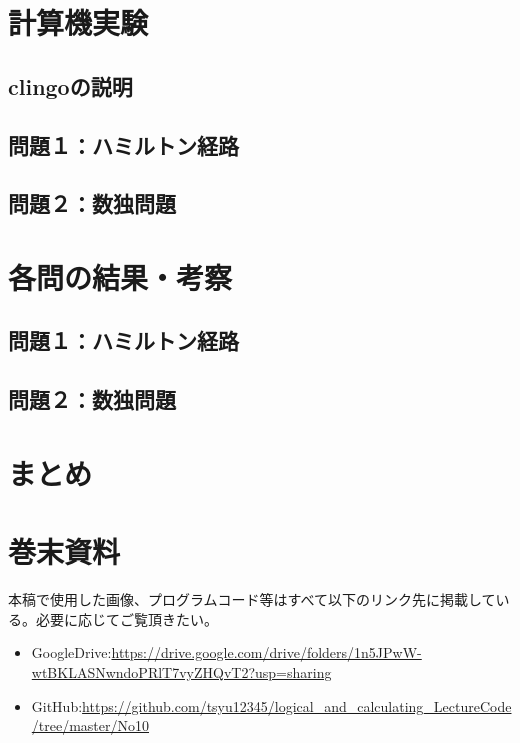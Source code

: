 \documentclass[dvipdfmx]{jsarticle}
\begin{document}
\section{計算機実験}
\subsection{clingoの説明}
\subsection{問題１：ハミルトン経路}
\subsection{問題２：数独問題}

\section{各問の結果・考察}
\subsection{問題１：ハミルトン経路}
\subsection{問題２：数独問題}

\section{まとめ}
\section{巻末資料}
本稿で使用した画像、プログラムコード等はすべて以下のリンク先に掲載している。必要に応じてご覧頂きたい。
\begin{itemize}
  \item GoogleDrive:\url{https://drive.google.com/drive/folders/1n5JPwW-wtBKLASNwndoPRlT7vyZHQvT2?usp=sharing}
  \item GitHub:\url{https://github.com/tsyu12345/logical_and_calculating_LectureCode/tree/master/No10}
\end{itemize}
\end{document}
